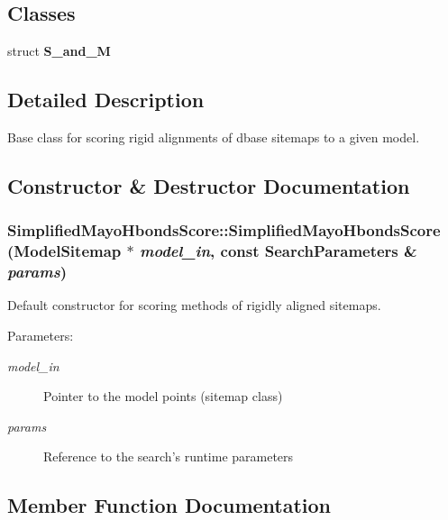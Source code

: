 \subsection*{Classes}
\begin{CompactItemize}
\item 
struct \textbf{S\_\-and\_\-M}
\end{CompactItemize}


\subsection{Detailed Description}
Base class for scoring rigid alignments of dbase sitemaps to a given model. 



\subsection{Constructor \& Destructor Documentation}
\subsubsection{\setlength{\rightskip}{0pt plus 5cm}Simplified\-Mayo\-Hbonds\-Score::Simplified\-Mayo\-Hbonds\-Score (\bf{Model\-Sitemap} $\ast$ {\em model\_\-in}, const \bf{Search\-Parameters} \& {\em params})}\label{classASCbase_1_1SimplifiedMayoHbondsScore_70771cd00d33a3ee88c11bbb36ae5068}


Default constructor for scoring methods of rigidly aligned sitemaps. 

\begin{Desc}
\item[Parameters:]
\begin{description}
\item[{\em model\_\-in}]Pointer to the model points (sitemap class) \item[{\em params}]Reference to the search's runtime parameters \end{description}
\end{Desc}


\subsection{Member Function Documentation}
